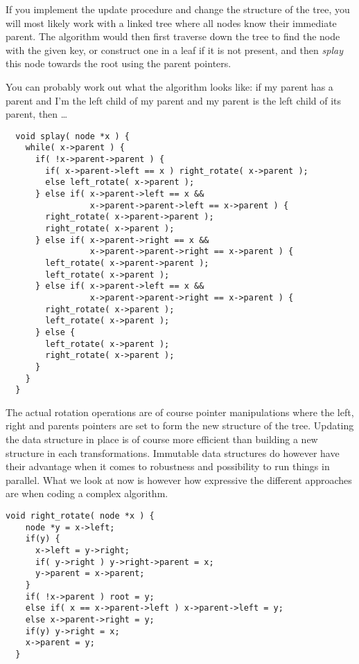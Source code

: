 \documentclass[a4paper,11pt]{article}
\begin{document}
If you implement the update procedure and change the structure of the
tree, you will most likely work with a linked tree where all nodes
know their immediate parent. The algorithm would then first traverse
down the tree to find the node with the given key, or construct one in
a leaf if it is not present, and then {\em splay} this node towards
the root using the parent pointers. 

You can probably work out what the algorithm looks like: if my parent
has a parent and I'm the left child of my parent and my parent is the
left child of its parent, then \ldots

\lstset{language=c++}

\begin{lstlisting}
  void splay( node *x ) {
    while( x->parent ) {
      if( !x->parent->parent ) {
        if( x->parent->left == x ) right_rotate( x->parent );
        else left_rotate( x->parent );
      } else if( x->parent->left == x && 
                 x->parent->parent->left == x->parent ) {
        right_rotate( x->parent->parent );
        right_rotate( x->parent );
      } else if( x->parent->right == x && 
                 x->parent->parent->right == x->parent ) {
        left_rotate( x->parent->parent );
        left_rotate( x->parent );
      } else if( x->parent->left == x && 
                 x->parent->parent->right == x->parent ) {
        right_rotate( x->parent );
        left_rotate( x->parent );
      } else {
        left_rotate( x->parent );
        right_rotate( x->parent );
      }
    }
  }  
\end{lstlisting}

The actual rotation operations are of course pointer manipulations
where the left, right and parents pointers are set to form the new
structure of the tree. Updating the data structure in place is of
course more efficient than building a new structure in each
transformations. Immutable data structures do however have their
advantage when it comes to robustness and possibility to run things in
parallel. What we look at now is however how expressive the different
approaches are when coding a complex algorithm.

\begin{lstlisting}
void right_rotate( node *x ) {
    node *y = x->left;
    if(y) {
      x->left = y->right;
      if( y->right ) y->right->parent = x;
      y->parent = x->parent;
    }
    if( !x->parent ) root = y;
    else if( x == x->parent->left ) x->parent->left = y;
    else x->parent->right = y;
    if(y) y->right = x;
    x->parent = y;
  }
\end{lstlisting}
\end{document}
